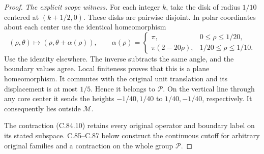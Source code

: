 \begin{proof}
\emph{The explicit scope witness.}
For each integer $k$, take the
disk of radius $1/10$ centered
at $(k+1/2,0)$. These disks are
pairwise disjoint. In polar
coordinates about each center
use the identical homeomorphism
\[
 (\rho,\theta)\longmapsto(\rho,\theta+\alpha(\rho)),
 \qquad
 \alpha(\rho)=
 \begin{cases}
  \pi,&0\leq\rho\leq1/20,\\
  \pi(2-20\rho),&1/20\leq\rho\leq1/10.
 \end{cases}                                                    \tag{C.84.12}
\]
Use the identity elsewhere.
The inverse subtracts the same
angle, and the boundary values
agree. Local finiteness proves
that this is a plane homeomorphism.
It commutes with the original
unit translation and its
displacement is at most $1/5$.
Hence it belongs to $\mathscr P$.
On the vertical line through
any core center it sends the
heights $-1/40,1/40$ to
$1/40,-1/40$, respectively.
It consequently lies outside
$\mathscr M$.

The contraction (C.84.10) retains
every original operator and
boundary label on its stated
subspace. C.85--C.87 below
construct the continuous cutoff
for arbitrary original families
and a contraction on the whole
group $\mathscr P$.
\end{proof}
